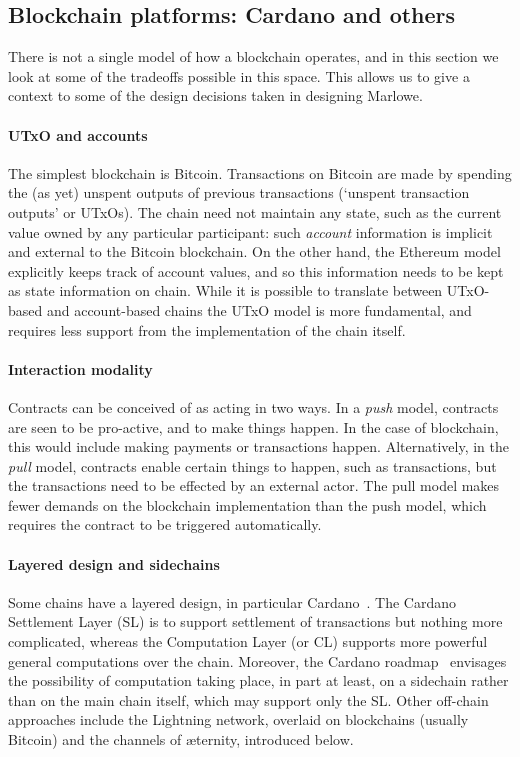 \documentclass[runningheads]{llncs}
\begin{document}
\subsection{Blockchain platforms: Cardano and others}

There is not a single model of how a blockchain operates, and in this section we look at some of the tradeoffs possible 
in this space. This allows us to give a context to some of the design decisions taken in designing Marlowe.  

\paragraph{UTxO and accounts}

The simplest blockchain is Bitcoin. Transactions on Bitcoin are made by spending the (as yet) unspent outputs of 
previous transactions (`unspent transaction outputs' or UTxOs). The chain need not maintain any state, such as the 
current value owned by any particular participant: such \emph{account} information is implicit and external to the 
Bitcoin blockchain. On the other hand, the Ethereum model explicitly keeps track of account values, and so this 
information needs to be kept as state information on chain. While it is possible to translate between UTxO-based and 
account-based chains  the UTxO model is more fundamental, and requires less support from the 
implementation of the chain itself.

\paragraph{Interaction modality}

Contracts can be conceived of as acting in two ways. In a \emph{push} model, contracts are seen to be pro-active, and to 
make things happen. In the case of blockchain, this would include making payments or transactions happen. 
Alternatively, in the \emph{pull} model, contracts enable certain things to happen, such as transactions, but the 
transactions need to be effected by an external actor. The pull model makes fewer demands on the blockchain 
implementation than the push model, which requires the contract to be triggered automatically.

\paragraph{Layered design and sidechains}

Some chains have a layered design, in particular Cardano~\cite{cardano}. The Cardano Settlement Layer (SL) is to 
support settlement of transactions but nothing more complicated, whereas the Computation Layer (or CL) supports more 
powerful general computations over the chain. Moreover, the Cardano roadmap~\cite{cardano-rationale} envisages the 
possibility of computation taking place, in part at least, on a sidechain rather than on the main chain itself, which 
may support only the SL. Other off-chain approaches include the Lightning network, overlaid on blockchains (usually 
Bitcoin) and the channels of \ae{}ternity, introduced below.
\end{document}
